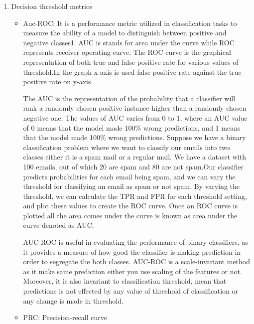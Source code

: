 \documentclass[12pt, a4paper, twoside]{report}
\theoremstyle{plain} %
\theoremstyle{definition} %
\theoremstyle{remark} %
\numberwithin{equation}{chapter}
\begin{document}
\begin{enumerate}
\begin{itemize}
According to the given  example 
\end{itemize}
\begin{equation}
\label{eq:F1score}
F_1 Score = 2\ times\ \frac{PrecisionRecall}{Precision + Recall}
\end{equation}

\item Decision threshold metrics

\begin{itemize}
\item Auc-ROC: 
It is a performance metric utilized in classification tasks to measure the ability of a model to distinguish between positive and negative classes1. AUC is stands for area under the curve while ROC represents receiver operating curve. The ROC curve is  the graphical representation of both true and false positive rate for various values of threshold.In the graph x-axis is used false positive rate against the true positive rate on y-axis. 

The AUC is the representation of the probability that a classifier will rank a randomly chosen positive instance higher than a randomly chosen negative one. The values of AUC varies from 0 to 1, where an AUC value of 0 means that the model made 100\% wrong predictions, and 1 means that the model made 100\% wrong predictions.
Suppose we have a binary classification problem where we want to classify our emails into two classes either it is a spam mail or a regular mail.
We have a dataset with 100 emails, out of which 20 are spam and 80 are not spam.Our classifier predicts probabilities for each email being spam, and we can vary the threshold for classifying an email as spam or not spam.
By varying the threshold, we can calculate the TPR and FPR for each threshold setting, and plot these values to create the ROC curve. Once an ROC curve is plotted  all the area comes under the curve is known as area under the curve denoted as AUC.

AUC-ROC is useful in evaluating the performance of binary classifiers, as it provides a measure of how good the classifier is making prediction  in order to segregate the both classes. AUC-ROC is a scale-invariant method as it make same prediction either you use scaling of the features or not. Moreover, it is also invariant to classification threshold, mean that predictions is not effected by any value of threshold of classification or any change is made in threshold.

\item PRC: Precision-recall curve


\end{itemize}
\end{enumerate}
\end{document}
